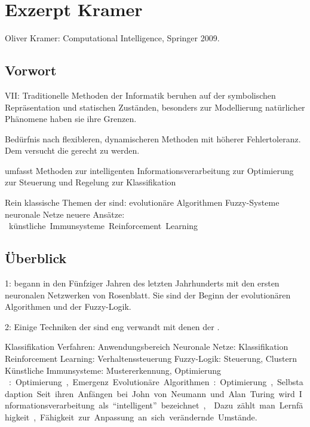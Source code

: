\chapter{Exzerpt Kramer}

Oliver Kramer: Computational Intelligence, Springer 2009.

\section{Vorwort} %

VII: Traditionelle Methoden der Informatik beruhen auf der
symbolischen Repräsentation und statischen Zuständen,
besonders zur Modellierung natürlicher Phänomene haben sie
ihre Grenzen.

Bedürfnis nach flexibleren, dynamischeren Methoden mit
höherer Fehlertoleranz. Dem versucht die \CI{} gerecht zu
werden.

\CI{} umfasst Methoden zur
    intelligenten Informationsverarbeitung
    zur Optimierung
    zur Steuerung und Regelung
    zur Klassifikation

Rein klassische Themen der \CI{} sind:
    evolutionäre Algorithmen
    Fuzzy-Systeme
    neuronale Netze
neuere Ansätze:
    \SI{}
    künstliche Immunsysteme
    Reinforcement Learning

\section{Überblick \CI{}} %

1: \CI{} begann in den Fünfziger Jahren des letzten
Jahrhunderts mit den ersten neuronalen Netzwerken von
Rosenblatt. Sie sind der Beginn der evolutionären
Algorithmen und der Fuzzy-Logik.

2: Einige Techniken der \CI{} sind eng verwandt mit denen
der \AI{}. 

Klassifikation Verfahren: Anwendungsbereich
    Neuronale Netze: Klassifikation
    Reinforcement Learning: Verhaltenssteuerung
    Fuzzy-Logik: Steuerung, Clustern
    Künstliche Immunsysteme: Mustererkennung, Optimierung
    \SI{}: Optimierung, Emergenz
    Evolutionäre Algorithmen: Optimierung, Selbstadaption.

Seit ihren Anfängen bei John von Neumann und Alan Turing
wird Informationsverarbeitung als \enquote{intelligent}
bezeichnet, 
. Dazu zählt man Lernfähigkeit,
Fähigkeit zur Anpassung an sich verändernde Umstände.

